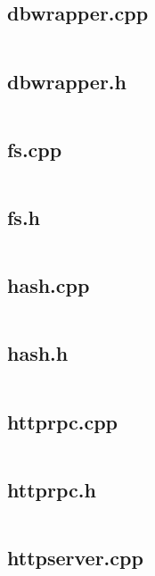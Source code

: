 \documentclass{article}
\begin{document}
\subsection{dbwrapper.cpp}
\inputminted{cpp}{/home/dufferzafar/dev/@clones/bitcoin/src/dbwrapper.cpp}
\newpage

\subsection{dbwrapper.h}
\inputminted{cpp}{/home/dufferzafar/dev/@clones/bitcoin/src/dbwrapper.h}
\newpage

\subsection{fs.cpp}
\inputminted{cpp}{/home/dufferzafar/dev/@clones/bitcoin/src/fs.cpp}
\newpage

\subsection{fs.h}
\inputminted{cpp}{/home/dufferzafar/dev/@clones/bitcoin/src/fs.h}
\newpage

\subsection{hash.cpp}
\inputminted{cpp}{/home/dufferzafar/dev/@clones/bitcoin/src/hash.cpp}
\newpage

\subsection{hash.h}
\inputminted{cpp}{/home/dufferzafar/dev/@clones/bitcoin/src/hash.h}
\newpage

\subsection{httprpc.cpp}
\inputminted{cpp}{/home/dufferzafar/dev/@clones/bitcoin/src/httprpc.cpp}
\newpage

\subsection{httprpc.h}
\inputminted{cpp}{/home/dufferzafar/dev/@clones/bitcoin/src/httprpc.h}
\newpage

\subsection{httpserver.cpp}
\inputminted{cpp}{/home/dufferzafar/dev/@clones/bitcoin/src/httpserver.cpp}
\newpage
\end{document}
